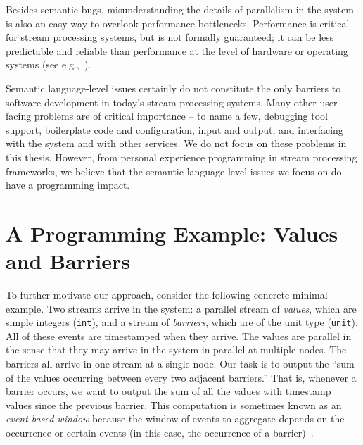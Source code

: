 Besides semantic bugs, misunderstanding the details of parallelism in the system is also an easy way to overlook performance bottlenecks. Performance is critical for stream processing systems, but is not formally guaranteed; it can be less predictable and reliable than performance at the level of hardware or operating systems (see e.g.,~\cite{lopez2016performance,dias2018dsp-survey,hoffmann2018snailtrail,bordin2020dspbench}).

Semantic language-level issues certainly do not constitute the only barriers to software development in today's stream processing systems. Many other user-facing problems are of critical importance -- to name a few, debugging tool support, boilerplate code and configuration, input and output, and interfacing with the system and with other services. We do not focus on these problems in this thesis. However, from personal experience programming in stream processing frameworks, we believe that the semantic language-level issues we focus on do have a programming impact.

\section{A Programming Example: Values and Barriers}
\label{ex:value-barrier}

To further motivate our approach, consider the following concrete minimal example.
Two streams arrive in the system: a parallel stream of \emph{values}, which are simple integers (\texttt{int}), and a stream of \emph{barriers}, which are of the unit type (\texttt{unit}).
All of these events are timestamped when they arrive.
The values are parallel in the sense that they may arrive in the system in parallel at multiple nodes.
The barriers all arrive in one stream at a single node.
Our task is to output the ``sum of the values occurring between every two adjacent barriers.'' That is, whenever a barrier occurs, we want to output the sum of all the values with timestamp values since the previous barrier. This computation is sometimes known as an \emph{event-based window} because the window of events to aggregate depends on the occurrence or certain events (in this case, the occurrence of a barrier)~\cite{EventBasedWindow}.

